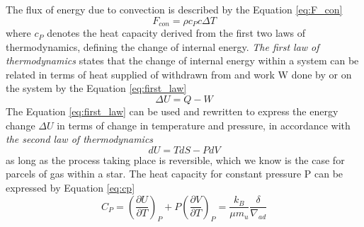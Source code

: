 \documentclass[10pt, nofootinbib, twocolumn]{revtex4-1}
\begin{document}
The flux of energy due to convection is described by the Equation \eqref{eq:F_con}
\begin{equation}\label{eq:F_con}
    F_{con}=\rho c_P c\Delta T
\end{equation}
where $c_P$ denotes the heat capacity derived from the first two laws of thermodynamics, defining the change of internal energy. \textit{The first law of thermodynamics} \cite{therm} states that the change of internal energy within a system can be related in terms of heat supplied of withdrawn from and work W done by or on the system by the Equation \eqref{eq:first_law}
\begin{equation}\label{eq:first_law}
    \Delta U = Q -W
\end{equation}
The Equation \eqref{eq:first_law} can be used and rewritten to express the energy change $\Delta U$ in terms of change in temperature and pressure, in accordance with \textit{the second law of thermodynamics} \cite{therm}
\begin{equation}\label{eq:second_law}
    dU = TdS - P dV
\end{equation}
as long as the process taking place is reversible, which we know is the case for parcels of gas within a star. The heat capacity for constant pressure P can be expressed by Equation \eqref{eq:cp} \cite{ast}
\begin{equation}\label{eq:cp}
    C_P=(\frac{\partial U}{\partial T})_P+P(\frac{\partial V}{\partial T})_P =\frac{k_B}{\mu m_u}\frac{\delta}{\nabla_{ad}}
\end{equation}
\end{document}
